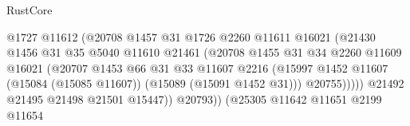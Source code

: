 \begin{lexlean}{RustCore}
\begin{coremodule}
                                              @1727
                                              @11612
                                              (@20708
                                                @1457
                                                @31
                                                @1726
                                                @2260
                                                @11611
                                                @16021
                                                (@21430
                                                  @1456
                                                  @31
                                                  @35
                                                  @5040
                                                  @11610
                                                  @21461
                                                  (@20708
                                                    @1455
                                                    @31
                                                    @34
                                                    @2260
                                                    @11609
                                                    @16021
                                                    (@20707
                                                      @1453
                                                      @66
                                                      @31
                                                      @33
                                                      @11607
                                                      @2216
                                                      (@15997
                                                        @1452
                                                        @11607
                                                        (@15084 (@15085 @11607))
                                                        (@15089 (@15091 @1452 @31)))
                                                      @20755)))))
                                            @21492
                                            @21495
                                            @21498
                                            @21501
                                            @15447))
                                        @20793))
                                    (@25305
                                      @11642
                                      @11651
                                      @2199
                                      @11654

\end{coremodule}
\end{lexlean}
